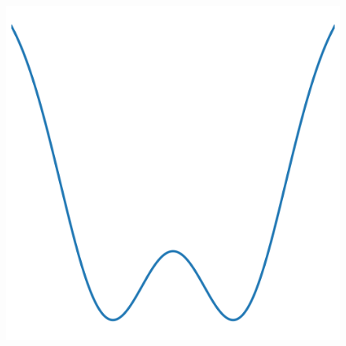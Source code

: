 \begin{frame}
\begin{columns}[c]
{\begin{figure}[h]
                \includegraphics[width=\textwidth]{images/introduction_energywell02.png}
            \end{figure}
        }
        
    \end{columns}
\end{frame}


